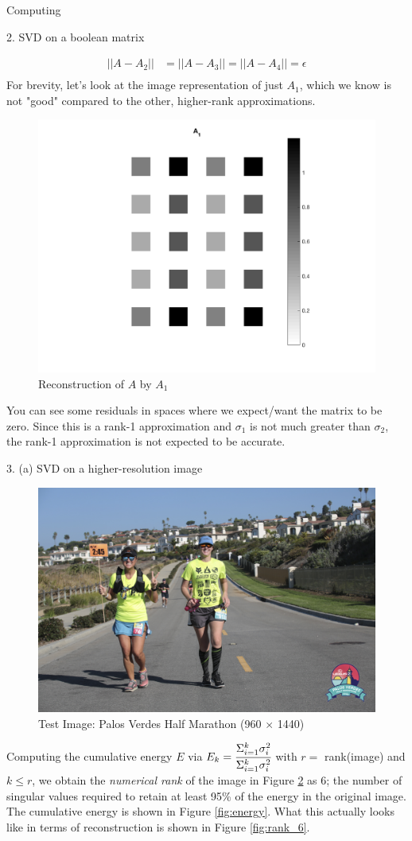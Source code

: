 \begin{section}{Computing}
\begin{homeworkSection}{2. SVD on a boolean matrix}
{\begin{align*}
        ||A- A_2|| &=  ||A- A_3|| = ||A- A_4|| = \epsilon \\
    \end{align*}
    For brevity, let's look at the image representation of just $A_1$, which we know is not "good" compared to the other, higher-rank approximations.
    \begin{figure}[H]
    \centering
    \includegraphics[width=0.35\columnwidth]{../data/Prob2_1}
    \caption{Reconstruction of $A$ by $A_1$}
    \label{fig:p2_1}
    \end{figure}
    You can see some residuals in spaces where we expect/want the matrix to be zero. Since this is a rank-1 approximation and $\sigma_1$ is not much greater than $\sigma_2$, the rank-1 approximation is not expected to be accurate.
}
\end{homeworkSection}


\begin{homeworkSection}{3. (a) SVD on a higher-resolution image}

\begin{figure}[H]
\centering
\includegraphics[width=0.95\columnwidth]{../data/testim}
\caption{Test Image: Palos Verdes Half Marathon (960 $\times$ 1440)}
\label{fig:myim}
\end{figure}

Computing the cumulative energy $E$ via $E_k = \cfrac{\Sigma_{i=1}^{k} \sigma_i^2}{\Sigma_{i=1}^{k} \sigma_i^2}$ with $r=$ rank(image) and $k \leq r$, we obtain the \textit{numerical rank} of the image in Figure \ref{fig:myim} as 6; the number of singular values required to retain at least 95\% of the energy in the original image. The cumulative energy is shown in Figure \ref{fig:energy}. What this actually looks like in terms of reconstruction is shown in Figure \ref{fig:rank_6}.


\end{homeworkSection}
\end{section}
